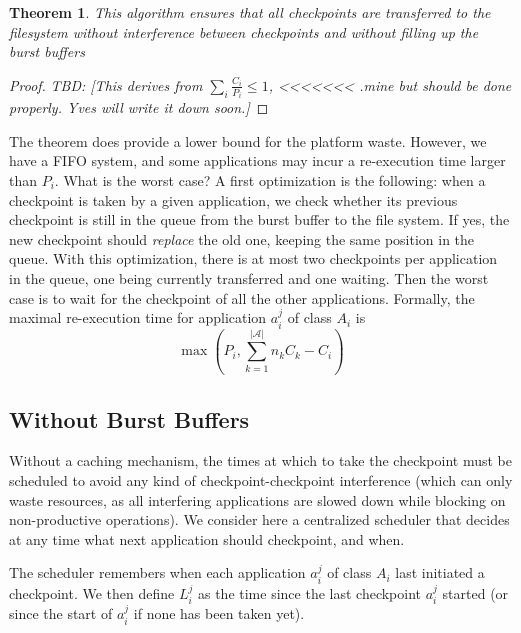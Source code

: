 \documentclass{article}
\newtheorem{theorem}{Theorem}
\newcommand{\nbapps}{|{\mathcal A}|}
\newcommand{\app}[1]{A_{#1}}
\newcommand{\application}[2]{a_{#1}^{#2}}
\newcommand{\period}[1]{P_{#1}}
\newcommand{\ckpt}[1]{C_{#1}}
\newcommand{\lastckpt}[2]{L_{#1}^{#2}}
\newcommand{\todo}[1]{\textit{TBD: [#1]}}
\begin{document}
\begin{theorem}
This algorithm ensures that all checkpoints are transferred to the
filesystem without interference between checkpoints and without
filling up the burst buffers
\end{theorem}

\begin{proof}
  \todo{This derives from $\sum_i \frac{\ckpt{i}}{\period{i}} \leq 1$,
<<<<<<< .mine
    but should be done properly. Yves will write it down soon.}
    \end{proof}
    
The theorem does provide a lower bound for the platform waste.
However, we have a FIFO system, and some applications may incur
a re-execution time larger than $P_{i}$. What is the worst case?
A first optimization is the following: when a checkpoint is taken
    by a given application, we check whether its previous checkpoint is
    still in the queue from the burst buffer to the file system. If yes, the new
checkpoint should \emph{replace} the old one, keeping the same position in the queue.
With this optimization, there is at most two checkpoints per application in the queue,
one being currently transferred and one waiting.
Then the worst case is to wait for the checkpoint of all the other applications.
Formally, the maximal re-execution time for application
$\application{i}{j}$ of class
$\app{i}$ is
$$\max(P_{i}, \sum_{k=1}^{\nbapps} n_{k}C_{k} - C_{i})$$

\subsection{Without Burst Buffers}

Without a caching mechanism, the times at which to take the checkpoint
must be scheduled to avoid any kind of checkpoint-checkpoint
interference (which can only waste resources, as all interfering
applications are slowed down while blocking on non-productive
operations). We consider here a centralized scheduler that decides at
any time what next application should checkpoint, and when.

The scheduler remembers when each application $\application{i}{j}$ of class
$\app{i}$ last initiated a checkpoint. We then define $\lastckpt{i}{j}$
as the time since the last checkpoint $\application{i}{j}$ started
(or since the start of $\application{i}{j}$ if none has been taken yet). 
\end{document}
